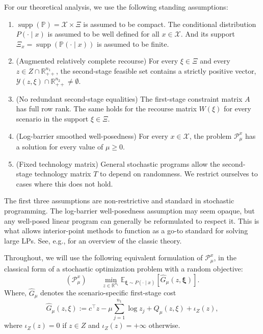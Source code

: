 \documentclass{article}
\newcommand{\R}{\mathbb{R}}
\newcommand{\E}{\mathbb{E}}
\newcommand{\1}{\mathbf{1}}
\theoremstyle{plain}
\theoremstyle{definition}
\theoremstyle{remark}
\begin{document}
For our theoretical analysis, we use the following standing assumptions:
\begin{enumerate}
    \item \label{ass:finite-support} $\operatorname{supp}(\mathbb P)=\mathcal X\times\Xi$ is assumed to be compact. The conditional distribution $P(\cdot\mid x)$ is assumed to be well defined for all $x\in\mathcal X$. And its support $\Xi_x=\operatorname{supp}(\mathbb P(\cdot\mid x))$ is assumed to be finite.
    \item \label{ass:augmented-recourse} (Augmented relatively complete recourse) For every $\xi\in\Xi$ and every $z\in Z\cap\R^{n_1}_{++}$, the second-stage feasible set contains a strictly positive vector, $\mathcal Y(z,\xi)\cap\R^{n_2}_{++}\neq\emptyset$.
    \item \label{ass:no-redundant-second-stage-equalities} (No redundant second-stage equalities) The first-stage constraint matrix $A$ has full row rank. The same holds for the recourse matrix $W(\xi)$ for every scenario in the support $\xi\in\Xi$.
    \item \label{ass:logbarrier-well-posedness} (Log-barrier smoothed well-posedness) For every $x\in\mathcal X$, the problem $\mathcal{P}_\mu^{x}$ has a solution for every value of $\mu\geq 0$.
    \item \label{ass:fixed-technology-matrix} (Fixed technology matrix) General stochastic programs allow the second-stage technology matrix $T$ to depend on randomness. We restrict ourselves to cases where this does not hold.
\end{enumerate}
The first three assumptions are non-restrictive and standard in stochastic programming. The log-barrier well-posedness assumption may seem opaque, but any well-posed linear program can generally be reformulated to respect it. This is what allows interior-point methods to function as a go-to standard for solving large LPs. See, e.g., \citet{wright1997primal} for an overview of the classic theory.

Throughout, we will use the following equivalent formulation of $\mathcal{P}_\mu^{x}$, in the classical form of a stochastic optimization problem with a random objective:
\begin{equation}
\label{eq:Gmu-min}
(\mathcal{P}_\mu^{x})\qquad
\min_{z\in\R^{n_1}}
\E_{\boldsymbol{\xi}\sim P(\cdot\mid x)}\!\left[\hat G_\mu(z,\boldsymbol{\xi})\right].
\end{equation}
Where, $\hat G_\mu$ denotes the scenario-specific first-stage cost
\begin{equation}
\label{eq:hatGmu}
\hat G_\mu(z,\xi):=
c^\top z
-\mu\sum_{j=1}^{n_1}\log z_j
+Q_\mu(z,\xi)
+\iota_{Z}(z),
\end{equation}
where $\iota_{Z}(z)=0$ if $z\in Z$ and $\iota_{Z}(z)=+\infty$ otherwise.
\end{document}
